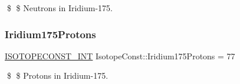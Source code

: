 \$ \$ Neutrons in Iridium-\/175. \mbox{\label{group___isotope_const-_iridium-_ir175_gace5d07ce89315a088d37365815f67219}} 
\subsubsection{\texorpdfstring{Iridium175\+Protons}{Iridium175Protons}}
{\footnotesize\ttfamily \mbox{\hyperlink{group___isotope_const-_macros_ga5f18360b3e99483a35c32d789e62621c}{I\+S\+O\+T\+O\+P\+E\+C\+O\+N\+S\+T\+\_\+\+I\+NT}} Isotope\+Const\+::\+Iridium175\+Protons = 77}

\$ \$ Protons in Iridium-\/175. 